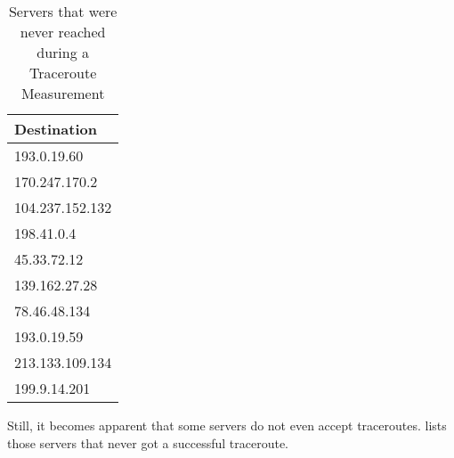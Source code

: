 \begin{table}
	\footnotesize
	\caption{Servers that were never reached during a Traceroute Measurement}
	\label{fig:unreachable-servers}
	\begin{tabular}{l}
		\toprule
		Destination     \\
		\midrule
		193.0.19.60     \\
		170.247.170.2   \\
		104.237.152.132 \\
		198.41.0.4      \\
		45.33.72.12     \\
		139.162.27.28   \\
		78.46.48.134    \\
		193.0.19.59     \\
		213.133.109.134 \\
		199.9.14.201    \\
		\bottomrule
	\end{tabular}
\end{table}

Still, it becomes apparent that some servers do not even accept traceroutes.
 lists those servers that never got a successful
traceroute.

